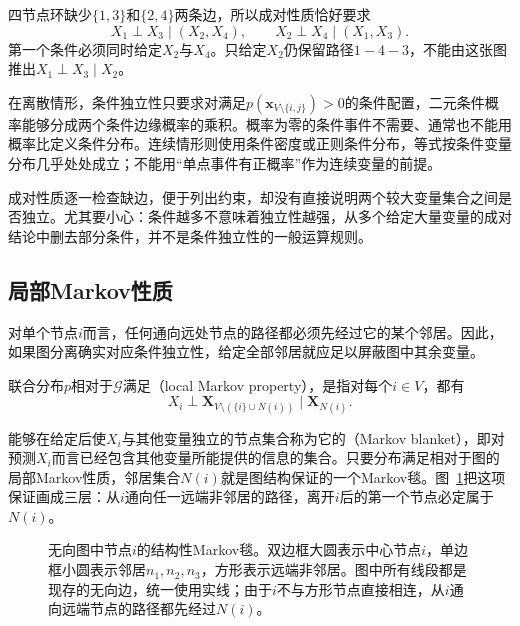 四节点环缺少$\{1,3\}$和$\{2,4\}$两条边，所以成对性质恰好要求
\[
  X_1\perp X_3\mid(X_2,X_4),
  \qquad
  X_2\perp X_4\mid(X_1,X_3).
\]
第一个条件必须同时给定$X_2$与$X_4$。只给定$X_2$仍保留路径$1-4-3$，不能由这张图推出$X_1\perp X_3\mid X_2$。

在离散情形，条件独立性只要求对满足$p(\bm{x}_{V\setminus\{i,j\}})>0$的条件配置，二元条件概率能够分成两个条件边缘概率的乘积。概率为零的条件事件不需要、通常也不能用概率比定义条件分布。连续情形则使用条件密度或正则条件分布，等式按条件变量分布几乎处处成立；不能用“单点事件有正概率”作为连续变量的前提。

成对性质逐一检查缺边，便于列出约束，却没有直接说明两个较大变量集合之间是否独立。尤其要小心：条件越多不意味着独立性越强，从多个给定大量变量的成对结论中删去部分条件，并不是条件独立性的一般运算规则。

\subsection{局部Markov性质}
\label{sec:pgm-undirected-local}

对单个节点$i$而言，任何通向远处节点的路径都必须先经过它的某个邻居。因此，如果图分离确实对应条件独立性，给定全部邻居就应足以屏蔽图中其余变量。

\begin{definition}[局部Markov性质]
  \label{def:pgm-undirected-local}
  联合分布$p$相对于$\mathcal{G}$满足（local Markov property），是指对每个$i\in V$，都有
  \begin{equation}
    X_i\perp\bm{X}_{V\setminus(\{i\}\cup N(i))}
       \mid\bm{X}_{N(i)}.
    \label{eq:pgm-undirected-local}
  \end{equation}
\end{definition}

能够在给定后使$X_i$与其他变量独立的节点集合称为它的（Markov blanket），即对预测$X_i$而言已经包含其他变量所能提供的信息的集合。只要分布满足相对于图的局部Markov性质，邻居集合$N(i)$就是图结构保证的一个Markov毯。图~\ref{fig:pgm-undirected-markov-blanket}把这项保证画成三层：从$i$通向任一远端非邻居的路径，离开$i$后的第一个节点必定属于$N(i)$。

\begin{figure}[htbp]
  \centering
  
  \caption{无向图中节点$i$的结构性Markov毯。双边框大圆表示中心节点$i$，单边框小圆表示邻居$n_1,n_2,n_3$，方形表示远端非邻居。图中所有线段都是现存的无向边，统一使用实线；由于$i$不与方形节点直接相连，从$i$通向远端节点的路径都先经过$N(i)$。}
  \label{fig:pgm-undirected-markov-blanket}
\end{figure}

